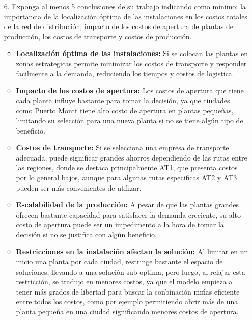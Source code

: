 \documentclass[a4paper]{article}
\begin{document}
\begin{enumerate}
        
        
        
        
        \item [6.] Exponga al menos 5 conclusiones de su trabajo indicando como m\'inimo: la importancia de la localizaci\'on \'optima de las instalaciones en los costos totales de la red de distribuci\'on, impacto de los costos de apertura de plantas de producci\'on, los costos de transporte y costos de producción.\\

        \begin{itemize}
            \item \textbf{Localizaci\'on \'optima de las instalaciones:} Si se colocan las plantas en zonas estrategicas permite minimizar los costos de transporte y responder facilmente a la demanda, reduciendo los tiempos y costos de logistica.

            \item \textbf{Impacto de los costos de apertura:} Los costos de apertura que tiene cada planta influye bastante para tomar la decisi\'on, ya que ciudades como Puerto Montt tiene alto costo de apertura en plantas peque\~{n}as, limitando su selecci\'on para una nueva planta si no se tiene alg\'un tipo de beneficio.

            \item \textbf{Costos de transporte:} Si se selecciona una empresa de transporte adecuada, puede significar grandes ahorros dependiendo de las rutas entre las regiones, donde se destaca principalmente AT1, que presenta costos por lo general bajos, aunque para algunas rutas especificas AT2 y AT3 pueden ser m\'as convenientes de utilizar.

            \item \textbf{Escalabilidad de la producci\'on:} A pesar de que las plantas grandes ofrecen bastante capacidad para satisfacer la demanda creciente, su alto costo de apertura puede ser un impedimento a la hora de tomar la decisi\'on si no se justifica con alg\'un beneficio.

            \item \textbf{Restricciones en la instalaci\'on afectan la soluci\'on:} Al limitar en un inicio una planta por cada ciudad, restringe bastante el espacio de soluciones, llevando a una soluci\'on sub-optima, pero luego, al relajar esta restricción, se tradujo en menores costos, ya que el modelo empieza a tener m\'as grados de libertad para buscar la conbinaci\'on m\'mas eficiente entre todos los costos, como por ejemplo permitiendo abrir m\'as de una planta peque\~{n}a en una ciudad significando menores costos de apertura.
        \end{itemize}
        \\
    \end{enumerate}
    
\end{document}
